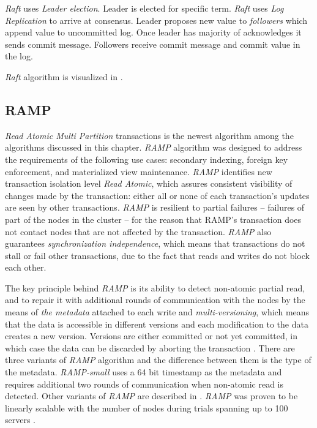 
\emph{Raft} uses \emph{Leader election}. Leader is elected for specific term. \emph{Raft} uses \emph{Log Replication} to arrive at consensus. Leader proposes new value to \emph{followers} which append value to uncommitted log. Once leader has majority of acknowledges it sends commit message. Followers receive commit message and commit value in the log. 

\emph{Raft} algorithm is visualized in \cite{raftVisual}.

\subsection{RAMP}\label{sec:theory:transactions:ramp}
\emph{Read Atomic Multi Partition} transactions \cite{Bailis:2014} is the newest algorithm among the algorithms discussed in this chapter. 
\emph{RAMP} algorithm was designed to address the requirements of the following use cases: secondary indexing, foreign key
enforcement, and materialized view maintenance.
\emph{RAMP} identifies new transaction isolation level \emph{Read Atomic}, which 
assures consistent visibility of changes made by the transaction: either all or none of each transaction's updates are seen by other transactions.
\emph{RAMP} is resilient to partial failures -- failures of part of the nodes in the cluster -- for the reason that RAMP's transaction does not contact nodes that are not affected by the transaction. 
\emph{RAMP} also guarantees \emph{synchronization independence}, which means that transactions do not stall or fail other transactions, due to the fact that reads and writes do not block each other. 

The key principle behind \emph{RAMP} is its ability to detect non-atomic partial read, and to repair it with additional rounds of communication with the nodes by the means of \emph{the metadata} attached to each write and \emph{multi-versioning}, which means that the data is accessible in different versions and each modification to the data creates a new version. Versions are either committed or not yet committed, in which case the data can be discarded by aborting the transaction \cite[p. 6]{Bailis:2014}. 
There are three variants of \emph{RAMP} algorithm and the difference between them is the type of the metadata. \emph{RAMP-small} uses a 64 bit timestamp as the metadata and requires additional two rounds of communication when non-atomic read is detected. Other variants of \emph{RAMP} are described in \cite[p. 5]{Bailis:2014}.
\emph{RAMP} was proven to be linearly scalable with the number of nodes during trials spanning up to 100 servers \cite[p. 10]{Bailis:2014}.

